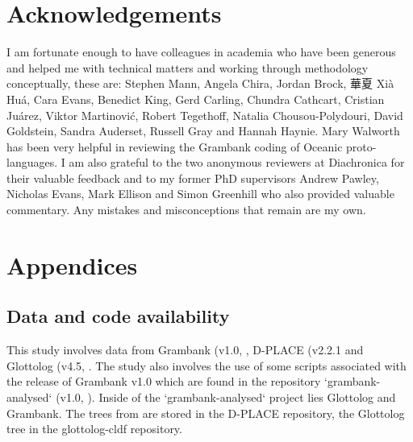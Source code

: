 \documentclass[12pt,letterpaper]{article}
\begin{document}



\FloatBarrier


\newpage
\section*{Acknowledgements}
I am fortunate enough to have colleagues in academia who have been generous and helped me with technical matters and working through methodology conceptually, these are: Stephen Mann, Angela Chira, Jordan Brock,  華夏 Xià Huá, Cara Evans, Benedict King, Gerd Carling, Chundra Cathcart, Cristian Juárez, Viktor Martinović, Robert Tegethoff, Natalia Chousou-Polydouri, David Goldstein, Sandra Auderset, Russell Gray and Hannah Haynie. Mary Walworth has been very helpful in reviewing the Grambank coding of Oceanic proto-languages. I am also grateful to the two anonymous reviewers at Diachronica for their valuable feedback and to my former PhD supervisors Andrew Pawley, Nicholas Evans, Mark Ellison and Simon Greenhill who also provided valuable commentary. Any mistakes and misconceptions that remain are my own.


\newpage

\appendix
\section*{Appendices}
\renewcommand{\thesubsection}{\Alph{subsection}}

\subsection{Data and code availability}
\label{supp_data_availability}
This study involves data from Grambank (v1.0, \cite{grambank_dataset_zenodo_v1, grambank_release}, D-PLACE (v2.2.1 \citet{d_place_all} and Glottolog (v4.5, \citet{glottolog4_5}. The study also involves the use of some scripts associated with the release of Grambank v1.0 which are found in the repository `grambank-analysed` (v1.0, \citet{grambank_analysed_1_0}). Inside of the `grambank-analysed` project lies Glottolog and Grambank. The trees from \citet{grayetal_2009} are stored in the D-PLACE repository, the Glottolog tree in the glottolog-cldf repository.
\end{document}
